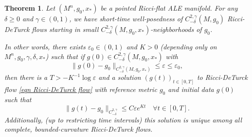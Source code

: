 \documentclass[12pt]{amsart}
\renewcommand{\1}{{\mathbf 1}}
\newcommand{\eps}{{\varepsilon}}
\newtheorem{thm}{Theorem}[section]
\theoremstyle{others}
\numberwithin{equation}{section}
\begin{document}
\begin{thm}\label{thm:wellposedness}
    Let $(M^n, g_0, x_*)$ be a pointed Ricci-flat ALE manifold.
    For any $\delta \geq 0$ and $\gamma \in (0,1)$, we have short-time well-posedness of $C^{2, \gamma}_{-\delta}(M, g_0)$ Ricci-DeTurck flows starting in small $C^{2, \gamma}_{-\delta}(M, g_0, x_*)$-neighborhoods of $g_0$.

    In other words, there exists $\eps_0 \in (0,1)$ and $K > 0$ (depending only on $M^n ,g_0, \gamma, \delta, x_*$) such that if $g(0) \in C^{2, \gamma}_{-\delta}(M, g_0, x_*)$ with 
    \begin{equation} \label{wellposedness:C2gammadelta_initial_est}
        \| g(0) - g_0\|_{C^{2, \gamma}_{-\delta}(M, g_0, x_*)} \leq \eps \leq \eps_0,
    \end{equation}
    then there is a $T > -K^{-1} \log \eps$ and a solution $(g(t))_{t \in [0, T]}$ to
    Ricci-DeTurck flow \eqref{eqn Ricci-DeTurck flow} with reference metric $g_0$ and initial data $g(0)$ such that 
    \begin{equation}\label{wellposedness:C2gammadeltaest}
        \| g(t ) - g_0 \|_{C^{2, \gamma}_{-\delta} } \leq C \eps e^{Kt} \quad  \forall t \in [0,T].
    \end{equation}
    Additionally, (up to restricting time intervals) this solution is unique among all complete, bounded-curvature Ricci-DeTurck flows.

\end{thm}
\end{document}
